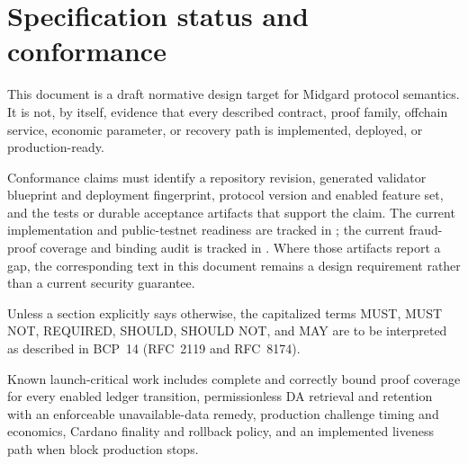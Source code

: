 \documentclass[../midgard.tex]{subfiles}
\begin{document}
\section*{Specification status and conformance}
\label{h:specification-status}

This document is a draft normative design target for Midgard protocol semantics.
It is not, by itself, evidence that every described contract, proof family, offchain service, economic parameter, or recovery path is implemented, deployed, or production-ready.

Conformance claims must identify a repository revision, generated validator blueprint and deployment fingerprint, protocol version and enabled feature set, and the tests or durable acceptance artifacts that support the claim.
The current implementation and public-testnet readiness are tracked in ; the current fraud-proof coverage and binding audit is tracked in .
Where those artifacts report a gap, the corresponding text in this document remains a design requirement rather than a current security guarantee.

Unless a section explicitly says otherwise, the capitalized terms MUST, MUST NOT, REQUIRED, SHOULD, SHOULD NOT, and MAY are to be interpreted as described in BCP~14 (RFC~2119 and RFC~8174).

Known launch-critical work includes complete and correctly bound proof coverage for every enabled ledger transition, permissionless DA retrieval and retention with an enforceable unavailable-data remedy, production challenge timing and economics, Cardano finality and rollback policy, and an implemented liveness path when block production stops.
\end{document}
